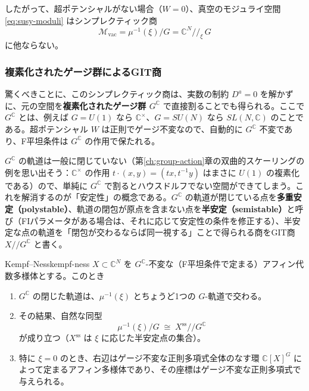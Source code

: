 \documentclass[uplatex, dvipdfmx, book]{jsbook}
\let\origsubsubsection\subsubsection
\renewcommand{\subsection}{\origsubsubsection}
\renewcommand{\subsubsection}{\paragraph}
\begin{document}
したがって、超ポテンシャルがない場合（$W = 0$）、真空のモジュライ空間 \eqref{eq:susy-moduli} はシンプレクティック商
\begin{equation}
    \mathcal{M}_{\text{vac}} = \mu^{-1}(\xi) / G = \mathbb{C}^N /\!/_{\xi}\, G
\end{equation}
に他ならない。

\subsection{複素化されたゲージ群によるGIT商}

驚くべきことに、このシンプレクティック商は、実数の制約 $D^a = 0$ を解かずに、元の空間を\textbf{複素化されたゲージ群 $G^\mathbb{C}$} で直接割ることでも得られる。ここで $G^\mathbb{C}$ とは、例えば $G = U(1)$ なら $\mathbb{C}^\times$、$G = SU(N)$ なら $SL(N, \mathbb{C})$ のことである。超ポテンシャル $W$ は正則でゲージ不変なので、自動的に $G^\mathbb{C}$ 不変であり、F平坦条件は $G^\mathbb{C}$ の作用で保たれる。

$G^\mathbb{C}$ の軌道は一般に閉じていない（第\ref{ch:group-action}章の双曲的スケーリングの例を思い出そう：$\mathbb{C}^\times$ の作用 $t\cdot(x, y) = (tx, t^{-1}y)$ はまさに $U(1)$ の複素化である）ので、単純に $G^\mathbb{C}$ で割るとハウスドルフでない空間ができてしまう。これを解消するのが「安定性」の概念である。$G^\mathbb{C}$ の軌道が閉じている点を\textbf{多重安定（polystable）}、軌道の閉包が原点を含まない点を\textbf{半安定（semistable）}と呼び（FIパラメータがある場合は、それに応じて安定性の条件を修正する）、半安定な点の軌道を「閉包が交わるならば同一視する」ことで得られる商をGIT商 $X /\!/ G^\mathbb{C}$ と書く。

\begin{mythm}{Kempf--Ness}{kempf-ness}
$X \subset \mathbb{C}^N$ を $G^\mathbb{C}$-不変な（F平坦条件で定まる）アフィン代数多様体とする。このとき
\begin{enumerate}
    \item $G^\mathbb{C}$ の閉じた軌道は、$\mu^{-1}(\xi)$ とちょうど1つの $G$-軌道で交わる。
    \item その結果、自然な同型
    \begin{equation*}
        \mu^{-1}(\xi) / G \;\cong\; X^{\text{ss}} /\!/ G^\mathbb{C}
    \end{equation*}
    が成り立つ（$X^{\text{ss}}$ は $\xi$ に応じた半安定点の集合）。
    \item 特に $\xi = 0$ のとき、右辺はゲージ不変な正則多項式全体のなす環 $\mathbb{C}[X]^{G}$ によって定まるアフィン多様体であり、その座標はゲージ不変な正則多項式で与えられる。
\end{enumerate}
\end{mythm}
\end{document}
